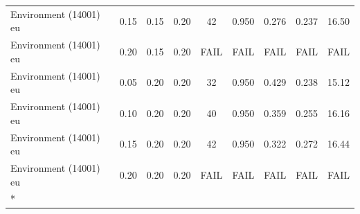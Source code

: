 \begin{longtable}[t]{lrrrccccc}
Environment (14001) eu & 0.15 & 0.15 & 0.20 & 42 & 0.950 & 0.276 & 0.237 & 16.50\\
Environment (14001) eu & 0.20 & 0.15 & 0.20 & FAIL & FAIL & FAIL & FAIL & FAIL\\
Environment (14001) eu & 0.05 & 0.20 & 0.20 & 32 & 0.950 & 0.429 & 0.238 & 15.12\\
\addlinespace
Environment (14001) eu & 0.10 & 0.20 & 0.20 & 40 & 0.950 & 0.359 & 0.255 & 16.16\\
Environment (14001) eu & 0.15 & 0.20 & 0.20 & 42 & 0.950 & 0.322 & 0.272 & 16.44\\
Environment (14001) eu & 0.20 & 0.20 & 0.20 & FAIL & FAIL & FAIL & FAIL & FAIL\\*
\end{longtable}
\endgroup{}
